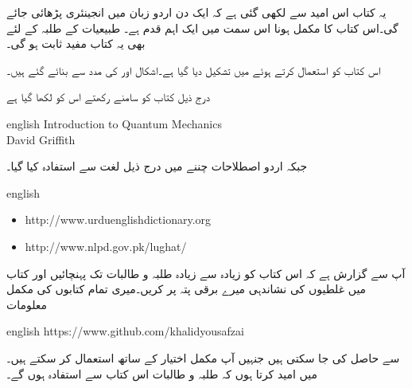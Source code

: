 یہ کتاب اس امید سے لکھی گئی ہے کہ ایک دن اردو زبان میں انجینئری پڑھائی جائے گی۔اس کتاب کا مکمل ہونا اس سمت میں ایک اہم قدم ہے۔ طبیعیات کے طلبہ کے لئے بھی یہ کتاب مفید ثابت ہو گی۔ 

اس کتاب کو  استعمال کرتے ہوئے  میں تشکیل دیا گیا ہے۔اشکال  اور  کی مدد سے بنائے گئے ہیں۔

درج ذیل کتاب کو سامنے رکھتے اس کو لکھا گیا ہے

{
\begin{otherlanguage*}{english}
Introduction to Quantum Mechanics\\
David Griffith
\end{otherlanguage*}
}

جبکہ اردو اصطلاحات چننے میں درج ذیل لغت سے استفادہ  کیا گیا۔
{
\begin{otherlanguage*}{english}
\begin{itemize}
\item
http:/\!\!/www.urduenglishdictionary.org
\item
http:/\!\!/www.nlpd.gov.pk/lughat/
\end{itemize}
\end{otherlanguage*}
}
آپ سے گزارش ہے کہ اس کتاب کو زیادہ سے زیادہ طلبہ و طالبات تک پہنچائیں اور کتاب میں غلطیوں کی نشاندہی میرے  برقی پتہ پر کریں۔میری تمام کتابوں کی مکمل  معلومات

{
\begin{otherlanguage*}{english}
https:/\!\!/www.github.com/khalidyousafzai
\end{otherlanguage*}
}

سے حاصل کی جا سکتی ہیں جنہیں آپ مکمل اختیار کے ساتھ استعمال کر سکتے ہیں۔میں امید کرتا ہوں کہ طلبہ و طالبات اس کتاب سے استفادہ ہوں گے۔
\vspace{5mm}

{}


